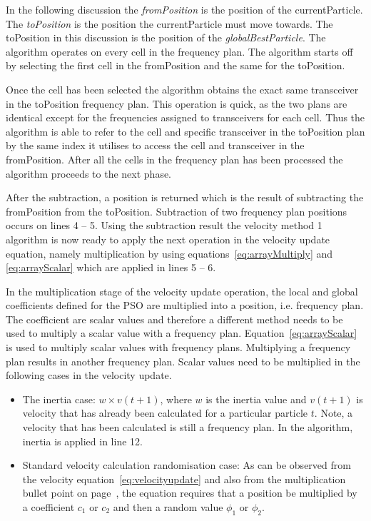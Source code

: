 In the following discussion the \emph{fromPosition} is the position of the currentParticle. The \emph{toPosition} is the position the currentParticle must move towards. The toPosition in this discussion is the position of the \emph{globalBestParticle}.
The algorithm operates on every cell in the frequency plan. The algorithm starts off by selecting the first cell in the fromPosition and the same for the toPosition. 

Once the cell has been selected the algorithm obtains the exact same transceiver in the toPosition frequency plan. This operation is quick, as the two plans are identical except for the frequencies assigned to transceivers for each cell. Thus the algorithm is able to refer to the cell and specific transceiver in the toPosition plan by the same index it utilises to access the cell and transceiver in the fromPosition. After all the cells in the frequency plan has been processed the algorithm proceeds to the next phase.

After the subtraction, a position is returned which is the result of subtracting the fromPosition from the toPosition. Subtraction of two frequency plan positions occurs on lines 4 -- 5. Using the subtraction result the velocity method 1 algorithm is now ready to apply the next operation in the velocity update equation, namely multiplication by using equations~\ref{eq:arrayMultiply} and \ref{eq:arrayScalar} which are applied in lines 5 -- 6.

In the multiplication stage of the velocity update operation, the local and global coefficients defined for the \gls{PSO} are multiplied into a position, i.e. frequency plan. The coefficient are scalar values and therefore a different method needs to be used to multiply a scalar value with a frequency plan. Equation~\ref{eq:arrayScalar} is used to multiply scalar values with frequency plans. Multiplying a frequency plan results in another frequency plan. Scalar values need to be multiplied in the following cases in the velocity update.
\begin{itemize}
\item The inertia case: $w \times v(t+1)$, where $w$ is the inertia value and $v(t+1)$ is velocity that has already been calculated for a particular particle $t$. Note, a velocity that has been calculated is still a frequency plan. In the algorithm, inertia is applied in line 12.
\item Standard velocity calculation randomisation case: As can be observed from the velocity equation~\ref{eq:velocityupdate} and also from the multiplication bullet point on page~\pageref{lst:velocitybreakup}, the equation requires that a position be multiplied by a coefficient $c_1$ or $c_2$ and then a random value $\phi_1$ or $\phi_2$. 
\end{itemize}

